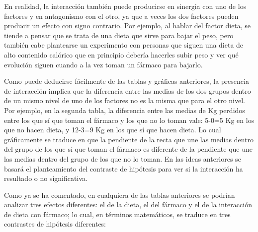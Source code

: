 \documentclass[
  a4paper,
]{scrreport}
\theoremstyle{plain}
\theoremstyle{definition}
\theoremstyle{definition}
\theoremstyle{remark}
\begin{document}
En realidad, la interacción también puede producirse en sinergia con uno
de los factores y en antagonismo con el otro, ya que a veces los dos
factores pueden producir un efecto con signo contrario. Por ejemplo, al
hablar del factor dieta, se tiende a pensar que se trata de una dieta
que sirve para bajar el peso, pero también cabe plantearse un
experimento con personas que siguen una dieta de alto contenido calórico
que en principio debería hacerles subir peso y ver qué evolución siguen
cuando a la vez toman un fármaco para bajarlo.

Como puede deducirse fácilmente de las tablas y gráficas anteriores, la
presencia de interacción implica que la diferencia entre las medias de
los dos grupos dentro de un mismo nivel de uno de los factores no es la
misma que para el otro nivel. Por ejemplo, en la segunda tabla, la
diferencia entre las medias de Kg perdidos entre los que sí que toman el
fármaco y los que no lo toman vale: 5-0=5 Kg en los que no hacen dieta,
y 12-3=9 Kg en los que sí que hacen dieta. Lo cual gráficamente se
traduce en que la pendiente de la recta que une las medias dentro del
grupo de los que sí que toman el fármaco es diferente de la pendiente
que une las medias dentro del grupo de los que no lo toman. En las ideas
anteriores se basará el planteamiento del contraste de hipótesis para
ver si la interacción ha resultado o no significativa.

Como ya se ha comentado, en cualquiera de las tablas anteriores se
podrían analizar tres efectos diferentes: el de la dieta, el del fármaco
y el de la interacción de dieta con fármaco; lo cual, en términos
matemáticos, se traduce en tres contrastes de hipótesis diferentes:
\end{document}
